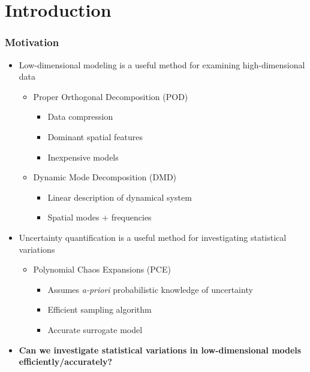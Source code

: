 \documentclass[9pt]{beamer}
\begin{document}
\section{Introduction}
\label{sec-1}
\begin{frame}
\frametitle{Motivation}
\label{sec-1-1}

\begin{itemize}
\item Low-dimensional modeling is a useful method for examining high-dimensional data
\begin{itemize}
\item Proper Orthogonal Decomposition (POD)
\begin{itemize}
\item Data compression
\item Dominant spatial features
\item Inexpensive models
\end{itemize}
\item Dynamic Mode Decomposition (DMD)
\begin{itemize}
\item Linear description of dynamical system
\item Spatial modes + frequencies
\end{itemize}
\end{itemize}
\item Uncertainty quantification is a useful method for investigating statistical variations
\begin{itemize}
\item Polynomial Chaos Expansions (PCE)
\begin{itemize}
\item Assumes \emph{a-priori} probabilistic knowledge of uncertainty
\item Efficient sampling algorithm
\item Accurate surrogate model
\end{itemize}
\end{itemize}
\item \textbf{Can we investigate statistical variations in low-dimensional models efficiently/accurately?}
\end{itemize}
\end{frame}
\end{document}
